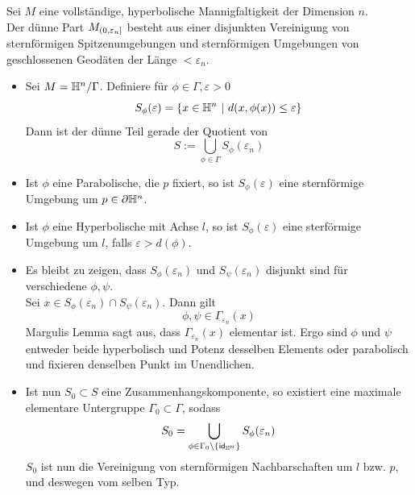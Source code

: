\documentclass{book}
\renewcommand{\epsilon}{\varepsilon}
\begin{document}
Sei $M$ eine vollständige, hyperbolische Mannigfaltigkeit der Dimension $n$.\\
Der dünne Part $\thin$ besteht aus einer disjunkten Vereinigung von sternförmigen Spitzenumgebungen und sternförmigen Umgebungen von geschlossenen Geodäten der Länge $< \epsilon_n$.
\begin{Beweis}{}
	\begin{itemize}
		\item 	Sei $M = \mathbb{H}^n / \Gamma$. Definiere für $\phi \in \Gamma, \epsilon > 0$
		\[ S_\phi(\epsilon) = \set{x \in \H^n}{d(x, \phi(x)) \leq \epsilon} \]
		Dann ist der dünne Teil gerade der Quotient von
		\[ S := \bigcup_{\phi \in \Gamma} S_\phi(\epsilon_n)  \]
		\item Ist $\phi$ eine Parabolische, die $p$ fixiert, so ist $S_\phi(\epsilon)$ eine sternförmige Umgebung um $p\in\partial \mathbb{H}^n$.
		\item Ist $\phi$ eine Hyperbolische mit Achse $l$, so ist $S_\phi(\epsilon)$ eine sterförmige Umgebung um $l$, falls $\epsilon > d(\phi)$.
		\item Es bleibt zu zeigen, dass $S_\phi(\epsilon_n)$ und $S_\psi(\epsilon_n)$ disjunkt sind für verschiedene $\phi, \psi$.\\
		Sei $x \in S_\phi(\epsilon_n)\cap S_\psi(\epsilon_n)$. Dann gilt
		\[ \phi, \psi \in \Gamma_{\epsilon_n}(x) \]
		Margulis Lemma sagt aus, dass $\Gamma_{\epsilon_n}(x)$ elementar ist. Ergo sind $\phi$ und $\psi$ entweder beide hyperbolisch und Potenz desselben Elements oder parabolisch und fixieren denselben Punkt im Unendlichen.
		\item Ist nun $S_0 \subset S$ eine Zusammenhangskomponente, so existiert eine maximale elementare Untergruppe $\Gamma_0 \subset \Gamma$, sodass
		\[S_0 = \bigcup_{\phi \in \Gamma_0\setminus \{ \id{\H^n}\}} S_\phi(\epsilon_n) \]
		$S_0$ ist nun die Vereinigung von sternförmigen Nachbarschaften um $l$ bzw. $p$, und deswegen vom selben Typ. 
	\end{itemize}
\end{Beweis}
\end{document}
